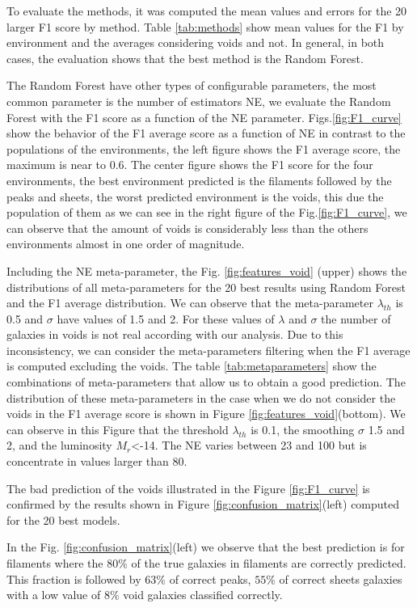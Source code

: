 \documentclass[usenatbib]{mnras}
\begin{document}
To evaluate the methods, it was computed the mean values and errors
for the 20 larger F1 score by method. Table \ref{tab:methods} show mean
values for the F1 by environment and the averages considering voids 
and not. 
In general, in both cases, the evaluation shows that the best method is
the Random Forest.  


The Random Forest have other types of configurable parameters, the
most common parameter is the number of estimators NE, we evaluate the
Random Forest with the F1 score as a function of the NE parameter.  
Figs.\ref{fig:F1_curve} show the behavior of the F1 average score as a
function of NE in contrast to the populations of the environments,
the left figure shows the F1 average score,
the maximum is near to 0.6.
The center figure shows the F1 score for the four environments,
the best environment predicted is the filaments followed by the peaks and sheets,
the worst predicted environment is the voids,
this due the population of them as we can see in the right figure of the Fig.\ref{fig:F1_curve},
we can observe that the amount of voids is considerably less than the
others environments almost in one order of magnitude. 

Including the NE meta-parameter, the Fig. \ref{fig:features_void} (upper)
shows the distributions of all meta-parameters for the 20 best results
using Random Forest and the F1 average distribution. We can observe that the meta-parameter $\lambda_{th}$
is 0.5 and $\sigma$ have values of 1.5 and 2. For these
values of $\lambda$ and $\sigma$ the number of galaxies in voids is not real according with our analysis. Due to this inconsistency, we can consider the meta-parameters filtering when the F1 average is computed excluding the voids. The table \ref{tab:metaparameters} show the combinations of meta-parameters that allow us to obtain a good prediction. The distribution of these meta-parameters
in the case when we do not consider the voids in the F1 average score is shown in Figure \ref{fig:features_void}(bottom). We can
observe in this Figure that the threshold $\lambda_{th}$ is 0.1, the smoothing $\sigma$ 1.5 and 2, and the luminosity $M_r$<-14. The NE varies between 23 and 100 but is concentrate in values larger than 80. 

The bad prediction of the voids illustrated in the Figure
\ref{fig:F1_curve} is confirmed by the results shown in
Figure \ref{fig:confusion_matrix}(left) computed for the 20 best models.  

In the Fig. \ref{fig:confusion_matrix}(left) we observe that the best prediction is for filaments where the $80\%$ of the true galaxies in filaments are correctly predicted. 
This fraction is followed by $63\%$ of correct peaks, $55\%$ of
correct sheets galaxies with a low value of $8\%$ void galaxies
classified correctly. 
\end{document}
